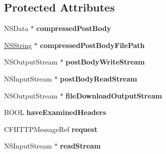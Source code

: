 \subsection*{Protected Attributes}
\begin{DoxyCompactItemize}
\item 
\hypertarget{interface_a_s_i_h_t_t_p_request_a1da882dbe37e07dfa6469dc3a900fd4b}{
NSData $\ast$ {\bfseries compressedPostBody}}
\label{interface_a_s_i_h_t_t_p_request_a1da882dbe37e07dfa6469dc3a900fd4b}

\item 
\hypertarget{interface_a_s_i_h_t_t_p_request_a8eb207eb1f5170ff4144bcd7f872948f}{
\hyperlink{class_n_s_string}{NSString} $\ast$ {\bfseries compressedPostBodyFilePath}}
\label{interface_a_s_i_h_t_t_p_request_a8eb207eb1f5170ff4144bcd7f872948f}

\item 
\hypertarget{interface_a_s_i_h_t_t_p_request_af1414dde76053106f008e998e4234c1b}{
NSOutputStream $\ast$ {\bfseries postBodyWriteStream}}
\label{interface_a_s_i_h_t_t_p_request_af1414dde76053106f008e998e4234c1b}

\item 
\hypertarget{interface_a_s_i_h_t_t_p_request_acdad29e2814eab8c071f700216ff6c6d}{
NSInputStream $\ast$ {\bfseries postBodyReadStream}}
\label{interface_a_s_i_h_t_t_p_request_acdad29e2814eab8c071f700216ff6c6d}

\item 
\hypertarget{interface_a_s_i_h_t_t_p_request_ac3adbb7024bfb74288106a331dc594c9}{
NSOutputStream $\ast$ {\bfseries fileDownloadOutputStream}}
\label{interface_a_s_i_h_t_t_p_request_ac3adbb7024bfb74288106a331dc594c9}

\item 
\hypertarget{interface_a_s_i_h_t_t_p_request_aede435a85f87109a18819b3d69976fec}{
BOOL {\bfseries haveExaminedHeaders}}
\label{interface_a_s_i_h_t_t_p_request_aede435a85f87109a18819b3d69976fec}

\item 
\hypertarget{interface_a_s_i_h_t_t_p_request_a43c23393b18061ee1ab4c5714c23867d}{
CFHTTPMessageRef {\bfseries request}}
\label{interface_a_s_i_h_t_t_p_request_a43c23393b18061ee1ab4c5714c23867d}

\item 
\hypertarget{interface_a_s_i_h_t_t_p_request_a0c5684a46a4a491371eb5142190ef119}{
NSInputStream $\ast$ {\bfseries readStream}}
\label{interface_a_s_i_h_t_t_p_request_a0c5684a46a4a491371eb5142190ef119}


\end{DoxyCompactItemize}
